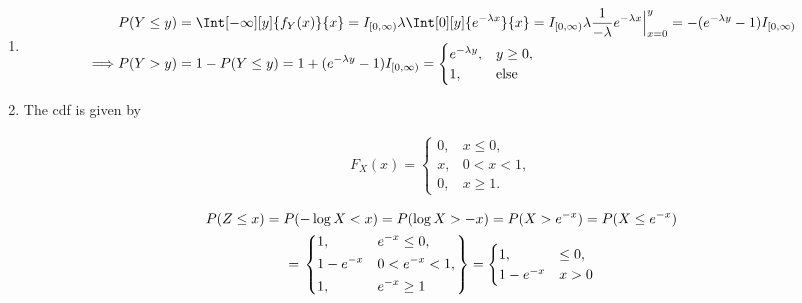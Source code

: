 \begin{solution}

\phantom{}

\begin{enumerate}[label = (\alph*)]

    \item

    \begin{align*}
        &
        P(Y \leq y)
        =
        \Int[-\infty][y]{f_Y(x)}{x}
        =
        I_{[0, \infty)} \lambda \Int[0][y]{e^{-\lambda x}}{x}
        =
        I_{[0, \infty)} \lambda \frac{1}{-\lambda} e^{-\lambda x} \Big |_{x=0}^y
        =
        -(e^{-\lambda y} - 1) I_{[0, \infty)} \\
        \implies &
        P(Y > y)
        =
        1 - P(Y \leq y)
        =
        1 + (e^{-\lambda y} - 1) I_{[0, \infty)}
        =
        \begin{cases}
            e^{-\lambda y}, & y \geq 0, \\
            1,              & \text{else}
        \end{cases}
    \end{align*}

    \item The cdf is given by
    
    \begin{align*}
        F_X(x)
        =
        \begin{cases}
            0, & x \leq 0,  \\
            x, & 0 < x < 1, \\
            0, & x \geq 1.
        \end{cases}
    \end{align*}

    \begin{multline*}
        P(Z \leq x)
        =
        P(-\log X < x)
        =
        P(\log X > -x)
        =
        P(X > e^{-x})
        =
        P(X \leq e^{-x}) \\
        =
        \begin{rcases}
            \begin{dcases}
                1,         & e^{-x} \leq 0, \\
                1 - e^{-x} & 0 < e^{-x} < 1, \\
                1,         & e^{-x} \geq 1                
            \end{dcases}
        \end{rcases}
        =
        \begin{cases}
            1,         & \leq 0, \\
            1 - e^{-x} & x > 0
        \end{cases}
    \end{multline*}

\end{enumerate}

\end{solution}

